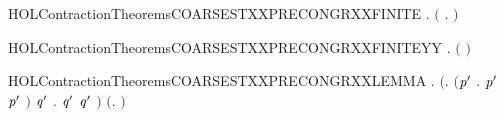 \begin{SaveVerbatim}{HOLContractionTheoremsCOARSESTXXPRECONGRXXFINITE}
\HOLTokenTurnstile{} \HOLSymConst{\HOLTokenForall{}} .
         \HOLSymConst{\HOLTokenConj{}}   \HOLSymConst{\HOLTokenImp{}}
       \ensuremath{(}   \HOLSymConst{\HOLTokenEquiv{}} \HOLSymConst{\HOLTokenForall{}}.  \HOLSymConst{\ensuremath{+}}    \HOLSymConst{\ensuremath{+}} \ensuremath{)}
\end{SaveVerbatim}
\newcommand{\HOLContractionTheoremsCOARSESTXXPRECONGRXXFINITE}{\UseVerbatim{HOLContractionTheoremsCOARSESTXXPRECONGRXXFINITE}}
\begin{SaveVerbatim}{HOLContractionTheoremsCOARSESTXXPRECONGRXXFINITEYY}
\HOLTokenTurnstile{} \HOLSymConst{\HOLTokenForall{}} .
         \HOLSymConst{\HOLTokenConj{}}   \HOLSymConst{\HOLTokenImp{}}
       \ensuremath{(}   \HOLSymConst{\HOLTokenEquiv{}}   \ensuremath{)}
\end{SaveVerbatim}
\newcommand{\HOLContractionTheoremsCOARSESTXXPRECONGRXXFINITEYY}{\UseVerbatim{HOLContractionTheoremsCOARSESTXXPRECONGRXXFINITEYY}}
\begin{SaveVerbatim}{HOLContractionTheoremsCOARSESTXXPRECONGRXXLEMMA}
\HOLTokenTurnstile{} \HOLSymConst{\HOLTokenForall{}} .
       \ensuremath{(}\HOLSymConst{\HOLTokenExists{}}.
              \HOLSymConst{\HOLTokenConj{}} \ensuremath{(}\HOLSymConst{\HOLTokenForall{}}\ensuremath{\HOLBoundVar{p}\sp{\prime}} .  \HOLTokenWeakTransBegin{}\HOLTokenWeakTransEnd \ensuremath{\HOLBoundVar{p}\sp{\prime}} \HOLSymConst{\HOLTokenImp{}} \HOLSymConst{\HOLTokenNeg{}} \ensuremath{\HOLBoundVar{p}\sp{\prime}} \ensuremath{)} \HOLSymConst{\HOLTokenConj{}}
            \HOLSymConst{\HOLTokenForall{}}\ensuremath{\HOLBoundVar{q}\sp{\prime}} .  \HOLTokenWeakTransBegin{}\HOLTokenWeakTransEnd \ensuremath{\HOLBoundVar{q}\sp{\prime}} \HOLSymConst{\HOLTokenImp{}} \HOLSymConst{\HOLTokenNeg{}} \ensuremath{\HOLBoundVar{q}\sp{\prime}} \ensuremath{)} \HOLSymConst{\HOLTokenImp{}}
       \ensuremath{(}\HOLSymConst{\HOLTokenForall{}}.  \HOLSymConst{\ensuremath{+}}    \HOLSymConst{\ensuremath{+}} \ensuremath{)} \HOLSymConst{\HOLTokenImp{}}
         
\end{SaveVerbatim}
